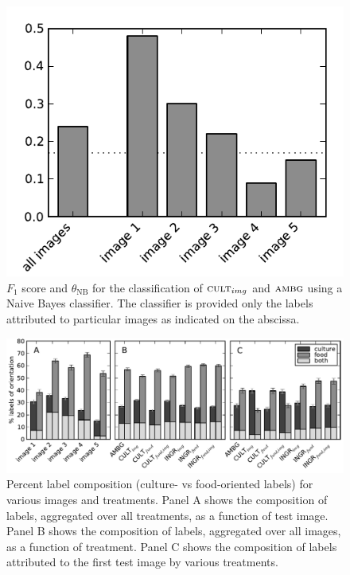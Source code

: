 \documentclass[a4paper]{report}
\begin{document}
\begin{figure}
	\includegraphics{figs/longitudinalF1scores-t0-t1_50.pdf}
	\caption{ $F_1$ score and $\theta_\text{NB}$ for the classification of 
	$\textsc{cult}_{img}$ and $\textsc{ambg}$ using a Naive Bayes 
	classifier.  The classifier is provided only the labels attributed to
	particular images as indicated on the abscissa.}
\end{figure}

\begin{figure}
	\includegraphics{figs/orientationVsTreatment.pdf}
	\caption{Percent label composition (culture- vs food-oriented labels) for 
		various images and treatments.  Panel A shows the composition of 
		labels, aggregated over all treatments, as a function of test image.
		Panel B shows the composition of labels, aggregated over all images, as
		a function of treatment.  Panel C shows the composition of labels 
		attributed to the first test image by various treatments.}
\end{figure}
\end{document}
